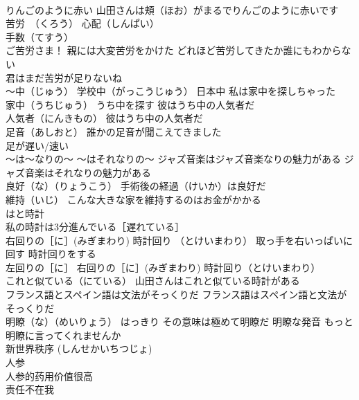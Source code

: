 \documentclass[8pt]{extreport}
\begin{document}
\begin{CJK}{UTF8}{min}
\\	りんごのように赤い 山田さんは頬（ほお）がまるでりんごのように赤いです
\\	苦労　（くろう） 心配（しんぱい） 
\\	手数（てすう） 
\\	ご苦労さま！ 親には大変苦労をかけた どれほど苦労してきたか誰にもわからない
\\	君はまだ苦労が足りないね
\\	～中（じゅう） 学校中（がっこうじゅう） 日本中 私は家中を探しちゃった
\\	家中（うちじゅう） うち中を探す 彼はうち中の人気者だ
\\	人気者（にんきもの） 彼はうち中の人気者だ
\\	足音（あしおと） 誰かの足音が聞こえてきました
\\	足が遅い/速い
\\	～は～なりの～ ～はそれなりの～ ジャズ音楽はジャズ音楽なりの魅力がある ジャズ音楽はそれなりの魅力がある
\\	良好（な）（りょうこう） 手術後の経過（けいか）は良好だ
\\	維持（いじ） こんな大きな家を維持するのはお金がかかる
\\	はと時計
\\	私の時計は3分進んでいる［遅れている］
\\	右回りの［に］(みぎまわり) 時計回り （とけいまわり） 取っ手を右いっぱいに回す 時計回りをする
\\	左回りの［に］ 右回りの［に］(みぎまわり) 時計回り（とけいまわり）
\\	これと似ている（にている） 山田さんはこれと似ている時計がある
\\	フランス語とスペイン語は文法がそっくりだ フランス語はスペイン語と文法がそっくりだ
\\	明瞭（な）（めいりょう） はっきり その意味は極めて明瞭だ 明瞭な発音 もっと明瞭に言ってくれませんか
\\	新世界秩序 (しんせかいちつじょ)
\\	人参 
\\	人参的药用价值很高 
\\	责任不在我 
\end{CJK}
\end{document}

